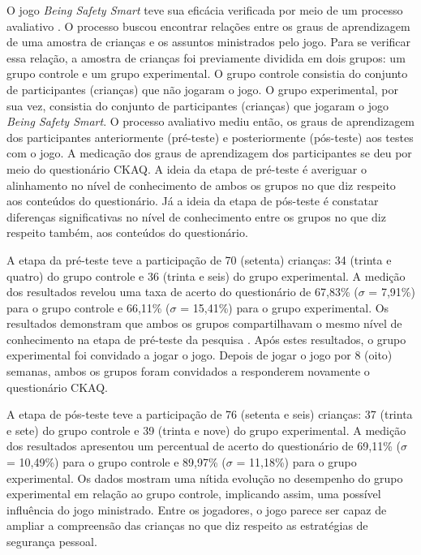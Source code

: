 O jogo \textit{Being Safety Smart} teve sua eficácia verificada por meio de um processo avaliativo \cite{jones2010being}. O processo buscou encontrar relações entre os graus de aprendizagem de uma amostra de crianças e os assuntos ministrados pelo jogo. Para se verificar essa relação, a amostra de crianças foi previamente dividida em dois grupos: um grupo controle e um grupo experimental. O grupo controle consistia do conjunto de participantes (crianças) que não jogaram o jogo. O grupo experimental, por sua vez, consistia do conjunto de participantes (crianças) que jogaram o jogo \textit{Being Safety Smart}. O processo avaliativo mediu então, os graus de aprendizagem dos participantes anteriormente (pré-teste) e posteriormente (pós-teste) aos testes com o jogo. A medicação dos graus de aprendizagem dos participantes se deu por meio do questionário \acf{CKAQ}. A ideia da etapa de pré-teste é averiguar o alinhamento no nível de conhecimento de ambos os grupos no que diz respeito aos conteúdos do questionário. Já a ideia da etapa de pós-teste é constatar diferenças significativas no nível de conhecimento entre os grupos no que diz respeito também, aos conteúdos do questionário.

A etapa da pré-teste teve a participação de 70 (setenta) crianças: 34 (trinta e quatro) do grupo controle e 36 (trinta e seis) do grupo experimental. A medição dos resultados revelou uma taxa de acerto do questionário de 67,83\% ($\sigma$ = 7,91\%) para o grupo controle e 66,11\% ($\sigma$ = 15,41\%) para o grupo experimental. Os resultados demonstram que ambos os grupos compartilhavam o mesmo nível de conhecimento na etapa de pré-teste da pesquisa \cite{jones2010being}. Após estes resultados, o grupo experimental foi convidado a jogar o jogo. Depois de jogar o jogo por 8 (oito) semanas, ambos os grupos foram convidados a responderem novamente o questionário \ac{CKAQ}. 

A etapa de pós-teste teve a participação de 76 (setenta e seis) crianças: 37 (trinta e sete) do grupo controle e 39 (trinta e nove) do grupo experimental. A medição dos resultados apresentou um percentual de acerto do questionário de 69,11\% ($\sigma$ = 10,49\%) para o grupo controle e 89,97\% ($\sigma$ = 11,18\%) para o grupo experimental. Os dados mostram uma nítida evolução no desempenho do grupo experimental em relação ao grupo controle, implicando assim, uma possível influência do jogo ministrado. Entre os jogadores, o jogo parece ser capaz de ampliar a compreensão das crianças no que diz respeito as estratégias de segurança pessoal.

